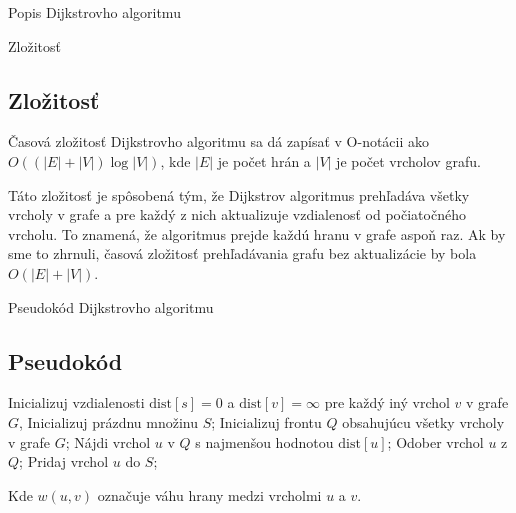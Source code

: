 \documentclass[15pt]{beamer}
\begin{document}
\begin{frame}{Popis Dijkstrovho algoritmu}
	\begin{block}{Zložitosť}
		\subsection{Zložitosť}
		Časová zložitosť Dijkstrovho algoritmu sa dá zapísať v O-notácii ako $O((|E|+|V|)\log |V|)$, kde $|E|$ je počet hrán a $|V|$ je počet vrcholov grafu.
				
		Táto zložitosť je spôsobená tým, že Dijkstrov algoritmus prehľadáva všetky vrcholy v grafe a pre každý z nich aktualizuje vzdialenosť od počiatočného vrcholu. To znamená, že algoritmus prejde každú hranu v grafe aspoň raz. Ak by sme to zhrnuli, časová zložitosť prehľadávania grafu bez aktualizácie by bola $O(|E|+|V|)$.
	\end{block}
\end{frame}

\begin{frame}{Pseudokód Dijkstrovho algoritmu}
	\subsection{Pseudokód}
	\begin{algorithm}[H]
		\SetAlgoLined
		Inicializuj vzdialenosti $\mathrm{dist}[s] = 0$ a $\mathrm{dist}[v] = \infty$ pre každý iný vrchol $v$ v grafe $G$, Inicializuj prázdnu množinu $S$;\newline
		Inicializuj frontu $Q$ obsahujúcu všetky vrcholy v grafe $G$; \newline
		{
			Nájdi vrchol $u$ v $Q$ s najmenšou hodnotou $\mathrm{dist}[u]$;\newline
			Odober vrchol $u$ z $Q$; \newline
			Pridaj vrchol $u$ do $S$; \newline
		}
	\end{algorithm}
	Kde $w(u,v)$ označuje váhu hrany medzi vrcholmi $u$ a $v$.
\end{frame}
\end{document}
